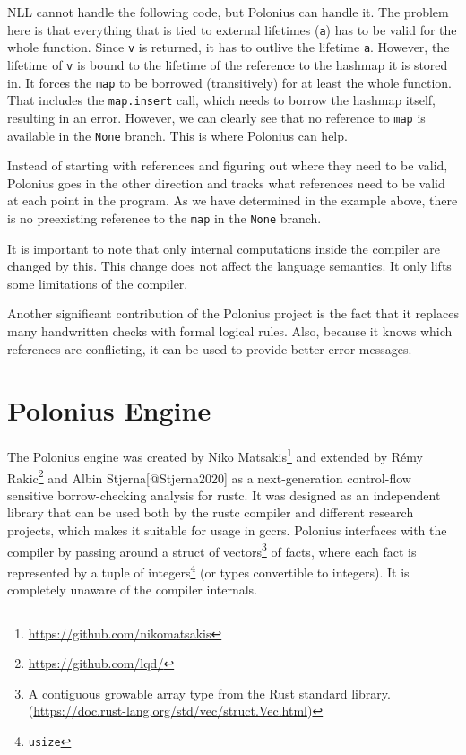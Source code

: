 \documentclass[
  11pt,
]{report}
\DeclareRobustCommand{\href}[2]{#2\footnote{\url{#1}}}
\begin{document}
NLL cannot handle the following code, but Polonius can handle it. The
problem here is that everything that is tied to external lifetimes
(\texttt{\textquotesingle{}a}) has to be valid for the whole function.
Since \texttt{v} is returned, it has to outlive the lifetime
\texttt{\textquotesingle{}a}. However, the lifetime of \texttt{v} is
bound to the lifetime of the reference to the hashmap it is stored in.
It forces the \texttt{map} to be borrowed (transitively) for at least
the whole function. That includes the \texttt{map.insert} call, which
needs to borrow the hashmap itself, resulting in an error. However, we
can clearly see that no reference to \texttt{map} is available in the
\texttt{None} branch. This is where Polonius can help.

Instead of starting with references and figuring out where they need to
be valid, Polonius goes in the other direction and tracks what
references need to be valid at each point in the program. As we have
determined in the example above, there is no preexisting reference to
the \texttt{map} in the \texttt{None} branch.

It is important to note that only internal computations inside the
compiler are changed by this. This change does not affect the language
semantics. It only lifts some limitations of the compiler.

Another significant contribution of the Polonius project is the fact
that it replaces many handwritten checks with formal logical rules.
Also, because it knows which references are conflicting, it can be used
to provide better error messages.

\chapter{Polonius Engine}\label{polonius-engine}

The Polonius engine was created by
\href{https://github.com/nikomatsakis}{Niko Matsakis} and extended by
\href{https://github.com/lqd/}{Rémy Rakic} and Albin
Stjerna{[}@Stjerna2020{]} as a next-generation control-flow sensitive
borrow-checking analysis for rustc. It was designed as an independent
library that can be used both by the rustc compiler and different
research projects, which makes it suitable for usage in gccrs. Polonius
interfaces with the compiler by passing around a struct of
vectors\footnote{A contiguous growable array type from the Rust standard
  library. (\url{https://doc.rust-lang.org/std/vec/struct.Vec.html})} of
facts, where each fact is represented by a tuple of integers\footnote{\texttt{usize}}
(or types convertible to integers). It is completely unaware of the
compiler internals.
\end{document}
